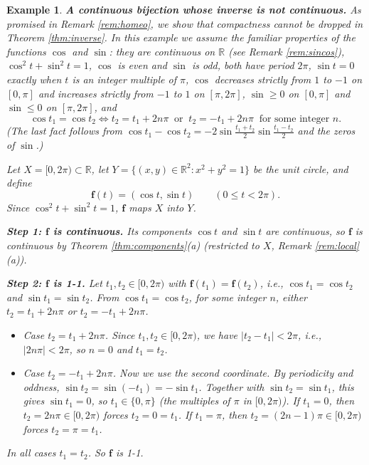 \documentclass{article}
\theoremstyle{mythm}
\newtheorem{example}[theorem]{Example}
\begin{document}
\begin{example}\label{ex:circle}
\textbf{A continuous bijection whose inverse is not continuous.} As promised in Remark \ref{rem:homeo}, we show that compactness cannot be dropped in Theorem \ref{thm:inverse}. In this example we assume the familiar properties of the functions $\cos$ and $\sin$: they are continuous on $\mathbb{R}$ (see Remark \ref{rem:sincos}), $\cos^2 t + \sin^2 t = 1$, $\cos$ is even and $\sin$ is odd, both have period $2\pi$, $\sin t = 0$ exactly when $t$ is an integer multiple of $\pi$, $\cos$ decreases strictly from $1$ to $-1$ on $[0,\pi]$ and increases strictly from $-1$ to $1$ on $[\pi, 2\pi]$, $\sin \geq 0$ on $[0,\pi]$ and $\sin \leq 0$ on $[\pi, 2\pi]$, and
\[
\cos t_1 = \cos t_2 \iff t_2 = t_1 + 2n\pi \ \text{ or } \ t_2 = -t_1 + 2n\pi \ \text{ for some integer } n.
\]
(The last fact follows from $\cos t_1 - \cos t_2 = -2 \sin\frac{t_1 + t_2}{2} \sin \frac{t_1 - t_2}{2}$ and the zeros of $\sin$.)

Let $X = [0, 2\pi) \subset \mathbb{R}$, let $Y = \{(x,y) \in \mathbb{R}^2 : x^2 + y^2 = 1\}$ be the unit circle, and define
\[
\mathbf{f}(t) = (\cos t, \sin t) \qquad (0 \leq t < 2\pi).
\]
Since $\cos^2 t + \sin^2 t = 1$, $\mathbf{f}$ maps $X$ into $Y$.

\textbf{Step 1: $\mathbf{f}$ is continuous.} Its components $\cos t$ and $\sin t$ are continuous, so $\mathbf{f}$ is continuous by Theorem \ref{thm:components}(a) (restricted to $X$, Remark \ref{rem:local}(a)).

\textbf{Step 2: $\mathbf{f}$ is 1-1.} Let $t_1, t_2 \in [0,2\pi)$ with $\mathbf{f}(t_1) = \mathbf{f}(t_2)$, i.e., $\cos t_1 = \cos t_2$ and $\sin t_1 = \sin t_2$. From $\cos t_1 = \cos t_2$, for some integer $n$, either $t_2 = t_1 + 2n\pi$ or $t_2 = -t_1 + 2n\pi$.
\begin{itemize}
    \item \textit{Case $t_2 = t_1 + 2n\pi$.} Since $t_1, t_2 \in [0, 2\pi)$, we have $|t_2 - t_1| < 2\pi$, i.e., $|2n\pi| < 2\pi$, so $n = 0$ and $t_1 = t_2$.
    \item \textit{Case $t_2 = -t_1 + 2n\pi$.} Now we use the second coordinate. By periodicity and oddness, $\sin t_2 = \sin(-t_1) = -\sin t_1$. Together with $\sin t_2 = \sin t_1$, this gives $\sin t_1 = 0$, so $t_1 \in \{0, \pi\}$ (the multiples of $\pi$ in $[0, 2\pi)$). If $t_1 = 0$, then $t_2 = 2n\pi \in [0, 2\pi)$ forces $t_2 = 0 = t_1$. If $t_1 = \pi$, then $t_2 = (2n-1)\pi \in [0,2\pi)$ forces $t_2 = \pi = t_1$.
\end{itemize}
In all cases $t_1 = t_2$. So $\mathbf{f}$ is 1-1.


\end{example}
\end{document}
